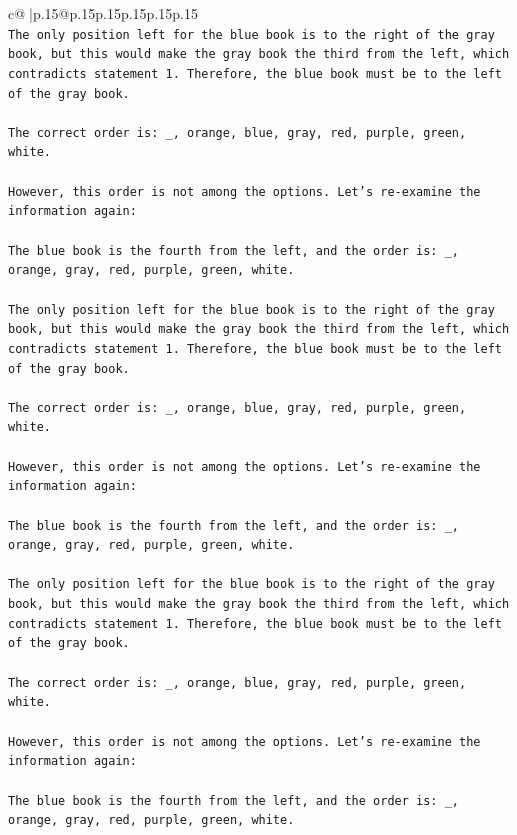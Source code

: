 \documentclass{article}
\begin{document}
{\begin{supertabular}{c@{$\;$}|p{.15\linewidth}@{}p{.15\linewidth}p{.15\linewidth}p{.15\linewidth}p{.15\linewidth}p{.15\linewidth}}
{{{\\ 
\texttt{The only position left for the blue book is to the right of the gray book, but this would make the gray book the third from the left, which contradicts statement 1. Therefore, the blue book must be to the left of the gray book.} \\
\\ 
\texttt{The correct order is: \_, orange, blue, gray, red, purple, green, white.} \\
\\ 
\texttt{However, this order is not among the options. Let's re{-}examine the information again:} \\
\\ 
\texttt{The blue book is the fourth from the left, and the order is: \_, orange, gray, red, purple, green, white.} \\
\\ 
\texttt{The only position left for the blue book is to the right of the gray book, but this would make the gray book the third from the left, which contradicts statement 1. Therefore, the blue book must be to the left of the gray book.} \\
\\ 
\texttt{The correct order is: \_, orange, blue, gray, red, purple, green, white.} \\
\\ 
\texttt{However, this order is not among the options. Let's re{-}examine the information again:} \\
\\ 
\texttt{The blue book is the fourth from the left, and the order is: \_, orange, gray, red, purple, green, white.} \\
\\ 
\texttt{The only position left for the blue book is to the right of the gray book, but this would make the gray book the third from the left, which contradicts statement 1. Therefore, the blue book must be to the left of the gray book.} \\
\\ 
\texttt{The correct order is: \_, orange, blue, gray, red, purple, green, white.} \\
\\ 
\texttt{However, this order is not among the options. Let's re{-}examine the information again:} \\
\\ 
\texttt{The blue book is the fourth from the left, and the order is: \_, orange, gray, red, purple, green, white.} \\
}}}
\end{supertabular}}
\end{document}
